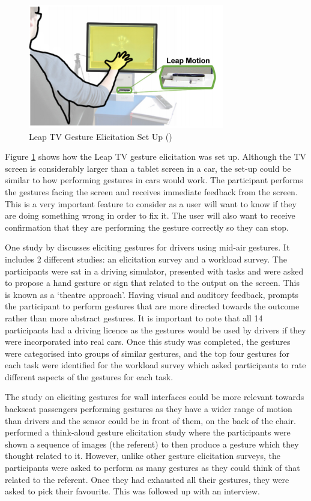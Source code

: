 \documentclass{l4proj}
\begin{document}
\begin{figure}[!htb]
    \centering
    \includegraphics[scale = 0.5]{images/leapTV.png}
    \caption{Leap TV Gesture Elicitation Set Up (\cite{Vatavu_Zaiti_2014})}
    \label{fig:leapTV}
\end{figure}

Figure \ref{fig:leapTV} shows how the Leap TV gesture elicitation was set up. Although the TV screen is considerably larger than a tablet screen in a car, the set-up could be similar to how performing gestures in cars would work. The participant performs the gestures facing the screen and receives immediate feedback from the screen. This is a very important feature to consider as a user will want to know if they are doing something wrong in order to fix it. The user will also want to receive confirmation that they are performing the gesture correctly so they can stop.

One study by \cite{May_Gable_Walker_2017} discusses eliciting gestures for drivers using mid-air gestures. It includes 2 different studies: an elicitation survey and a workload survey. The participants were sat in a driving simulator,  presented with tasks and were asked to propose a hand gesture or sign that related to the output on the screen. This is known as a ‘theatre approach’. Having visual and auditory feedback, prompts the participant to perform gestures that are more directed towards the outcome rather than more abstract gestures. It is important to note that all 14 participants had a driving licence as the gestures would be used by drivers if they were incorporated into real cars. Once this study was completed, the gestures were categorised into groups of similar gestures, and the top four gestures for each task were identified for the workload survey which asked participants to rate different aspects of the gestures for each task.

The study on eliciting gestures for wall interfaces could be more relevant towards backseat passengers performing gestures as they have a wider range of motion than drivers  and the sensor could be in front of them, on the back of the chair. \cite{Wittorf_Jakobsen_2016} performed a think-aloud gesture elicitation study where the participants were shown a sequence of images (the referent) to then produce a gesture which they thought related to it. However, unlike other gesture elicitation surveys, the participants were asked to perform as many gestures as they could think of that related to the referent. Once they had exhausted all their gestures, they were asked to pick their favourite. This was followed up with an interview. 
\end{document}
